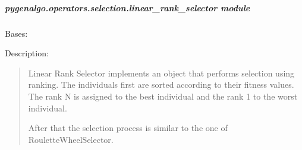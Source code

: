 \documentclass[letterpaper,10pt,english]{sphinxmanual}
\begin{document}
\subparagraph{pygenalgo.operators.selection.linear\_rank\_selector module}
\label{\detokenize{pygenalgo.operators.selection:module-pygenalgo.operators.selection.linear_rank_selector}}\label{\detokenize{pygenalgo.operators.selection:pygenalgo-operators-selection-linear-rank-selector-module}}

\begin{fulllineitems}
\label{\detokenize{pygenalgo.operators.selection:pygenalgo.operators.selection.linear_rank_selector.LinearRankSelector}}
\pysigstartsignatures
{}
\pysigstopsignatures
\sphinxAtStartPar
Bases: {\hyperref[\detokenize{pygenalgo.operators.selection:pygenalgo.operators.selection.select_operator.SelectionOperator}]{}}

\sphinxAtStartPar
Description:
\begin{quote}

\sphinxAtStartPar
Linear Rank Selector implements an object that performs selection using ranking.
The individuals first are sorted according to their fitness values. The rank N
is assigned to the best individual and the rank 1 to the worst individual.

\sphinxAtStartPar
After that the selection process is similar to the one of RouletteWheelSelector.
\end{quote}


\end{fulllineitems}
\end{document}
